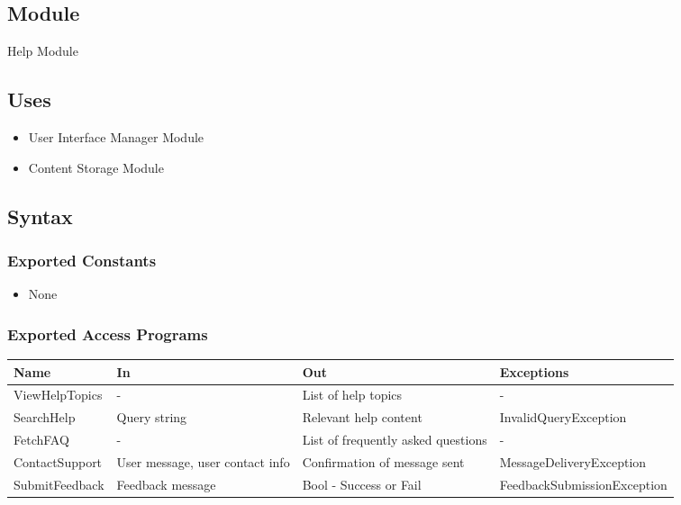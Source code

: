 \documentclass[12pt, titlepage]{article}
\begin{document}
\subsection{Module}

Help Module

\subsection{Uses}

\begin{itemize}
  \item User Interface Manager Module
  \item Content Storage Module
\end{itemize}

\subsection{Syntax}

\subsubsection{Exported Constants}

\begin{itemize}
  \item None
\end{itemize}

\subsubsection{Exported Access Programs}

\begin{center}
  \begin{tabular}{p{3cm} p{4cm} p{4cm} p{5cm}}
    \hline
    \textbf{Name}  & \textbf{In}                     & \textbf{Out}                       & \textbf{Exceptions}         \\
    \hline
    ViewHelpTopics & -                               & List of help topics                & -                           \\
    \hline
    SearchHelp     & Query string                    & Relevant help content              & InvalidQueryException       \\
    \hline
    FetchFAQ       & -                               & List of frequently asked questions & -                           \\
    \hline
    ContactSupport & User message, user contact info & Confirmation of message sent       & MessageDeliveryException    \\
    \hline
    SubmitFeedback & Feedback message                & Bool - Success or Fail             & FeedbackSubmissionException \\
    \hline
  \end{tabular}
\end{center}
\end{document}
